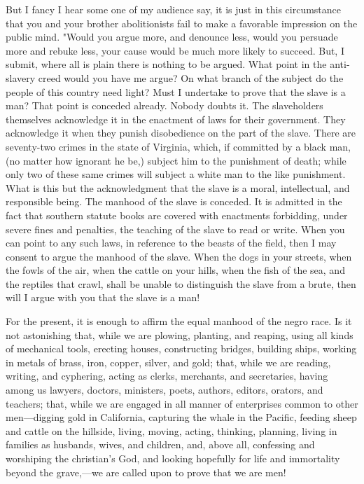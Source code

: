 But I fancy I hear some one of my audience say, it is just in this
circumstance that you and your brother abolitionists fail to make a
favorable impression on the public mind. "Would you argue more, and
denounce less, would you persuade more and rebuke less, your cause would
be much more likely to succeed. But, I submit, where all is plain there
is nothing to be argued. What point in the anti-slavery creed would you
have me argue? On what branch of the subject do the people of this
country need light? Must I undertake to prove that the slave is a man?
That point is conceded already. Nobody doubts it. The slaveholders
themselves acknowledge it in the enactment of laws for their government.
They acknowledge it when they punish disobedience on the part of the
slave. There are seventy-two crimes in the state of Virginia, which, if
committed by a black man, (no matter how ignorant he be,) subject him to
the punishment of death; while only two of these same crimes will
subject a white man to the like punishment. What is this but the
acknowledgment that the slave is a moral, intellectual, and responsible
being. The manhood of the slave is conceded. It is admitted in the fact
that southern statute books are covered with enactments forbidding,
under severe fines and penalties, the teaching of the slave to read or
write. When you can point to any such laws, in reference to the beasts
of the field, then I may consent to argue the manhood of the slave. When
the dogs in your streets, when the fowls of the air, when the cattle on
your hills, when the fish of the sea, and the reptiles that crawl, shall
be unable to distinguish the slave from a brute, then will I argue with
you that the slave is a man!

For the present, it is enough to affirm the equal manhood of the negro
race. Is it not astonishing that, while we are plowing, planting, and
reaping, using all kinds of mechanical tools, erecting houses,
constructing bridges, building ships, working in metals of brass, iron,
copper, silver, and gold; that, while we are reading, writing, and
cyphering, acting as clerks, merchants, and secretaries, having among us
lawyers, doctors, ministers, poets, authors, editors, orators, and
teachers; that, while we are engaged in all manner of enterprises common
to other men---digging gold in California, capturing the whale in the
Pacific, feeding sheep and cattle on the {}hillside, living, moving,
acting, thinking, planning, living in families as husbands, wives, and
children, and, above all, confessing and worshiping the christian's God,
and looking hopefully for life and immortality beyond the grave,---we
are called upon to prove that we are men!

